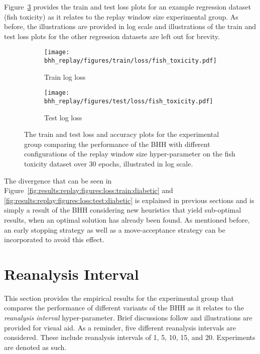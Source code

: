 Figure~\ref{fig:results:replay:figures:fish_toxicity} provides the train and test loss plots for an example regression dataset (fish toxicity) as it relates to the replay window size experimental group. As before, the illustrations are provided in log scale and illustrations of the train and test loss plots for the other regression datasets are left out for brevity.

\begin{figure}[htbp]
      \begin{subfigure}{0.5\textwidth}
            \centering
            \texttt{[image: bhh\_replay/figures/train/loss/fish\_toxicity.pdf]}
            \caption{Train log loss}
            \label{fig:results:replay:figures:loss:train:fish_toxicity}
      \end{subfigure}
      \begin{subfigure}{0.5\textwidth}
            \centering
            \texttt{[image: bhh\_replay/figures/test/loss/fish\_toxicity.pdf]}
            \caption{Test log loss}
            \label{fig:results:replay:figures:loss:test:fish_toxicity}
      \end{subfigure}
      \par\bigskip
      \caption{The train and test loss and accuracy plots for the experimental group comparing the performance of the \acs{BHH} with different configurations of the replay window size hyper-parameter on the fish toxicity dataset over 30 epochs, illustrated in log scale.}
      \label{fig:results:replay:figures:fish_toxicity}
\end{figure}

The divergence that can be seen in Figure~\ref{fig:results:replay:figures:loss:train:diabetic} and \ref{fig:results:replay:figures:loss:test:diabetic} is explained in previous sections and is simply a result of the \acs{BHH} considering new heuristics that yield sub-optimal results, when an optimal solution has already been found. As mentioned before, an early stopping strategy as well as a move-acceptance strategy can be incorporated to avoid this effect.



\section{Reanalysis Interval}\label{sec:results:reanalysis}

This section provides the empirical results for the experimental group that compares the performance of different variants of the \acs{BHH} as it relates to the \textit{reanalysis interval} hyper-parameter. Brief discussions follow and illustrations are provided for visual aid. As a reminder, five different reanalysis intervals are considered. These include reanalysis intervals of 1, 5, 10, 15, and 20. Experiments are denoted as such.

